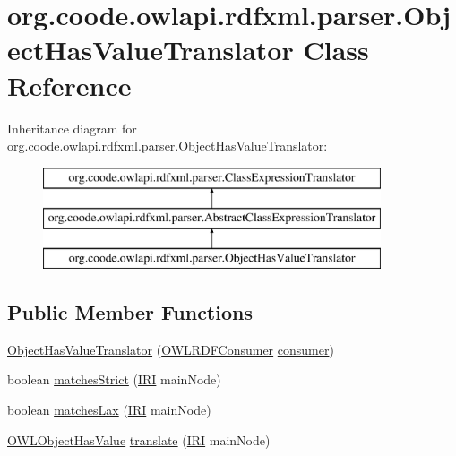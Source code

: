 \hypertarget{classorg_1_1coode_1_1owlapi_1_1rdfxml_1_1parser_1_1_object_has_value_translator}{\section{org.\-coode.\-owlapi.\-rdfxml.\-parser.\-Object\-Has\-Value\-Translator Class Reference}
\label{classorg_1_1coode_1_1owlapi_1_1rdfxml_1_1parser_1_1_object_has_value_translator}
}
Inheritance diagram for org.\-coode.\-owlapi.\-rdfxml.\-parser.\-Object\-Has\-Value\-Translator\-:\begin{figure}[H]
\begin{center}
\leavevmode
\includegraphics[height=3.000000cm]{classorg_1_1coode_1_1owlapi_1_1rdfxml_1_1parser_1_1_object_has_value_translator}
\end{center}
\end{figure}
\subsection*{Public Member Functions}
\begin{DoxyCompactItemize}
\item 
\hyperlink{classorg_1_1coode_1_1owlapi_1_1rdfxml_1_1parser_1_1_object_has_value_translator_ae2a81d4710ec56c038fe7604796858a4}{Object\-Has\-Value\-Translator} (\hyperlink{classorg_1_1coode_1_1owlapi_1_1rdfxml_1_1parser_1_1_o_w_l_r_d_f_consumer}{O\-W\-L\-R\-D\-F\-Consumer} \hyperlink{classorg_1_1coode_1_1owlapi_1_1rdfxml_1_1parser_1_1_abstract_class_expression_translator_ae547084cdd5b92c03835b5aa404f823b}{consumer})
\item 
boolean \hyperlink{classorg_1_1coode_1_1owlapi_1_1rdfxml_1_1parser_1_1_object_has_value_translator_abac131adf215ddb701b8f81867a3845f}{matches\-Strict} (\hyperlink{classorg_1_1semanticweb_1_1owlapi_1_1model_1_1_i_r_i}{I\-R\-I} main\-Node)
\item 
boolean \hyperlink{classorg_1_1coode_1_1owlapi_1_1rdfxml_1_1parser_1_1_object_has_value_translator_ab76dfbf9775af55289d3ed967f9130f6}{matches\-Lax} (\hyperlink{classorg_1_1semanticweb_1_1owlapi_1_1model_1_1_i_r_i}{I\-R\-I} main\-Node)
\item 
\hyperlink{interfaceorg_1_1semanticweb_1_1owlapi_1_1model_1_1_o_w_l_object_has_value}{O\-W\-L\-Object\-Has\-Value} \hyperlink{classorg_1_1coode_1_1owlapi_1_1rdfxml_1_1parser_1_1_object_has_value_translator_af859ee0888b1f9b3124bba993df3ad95}{translate} (\hyperlink{classorg_1_1semanticweb_1_1owlapi_1_1model_1_1_i_r_i}{I\-R\-I} main\-Node)
\end{DoxyCompactItemize}
